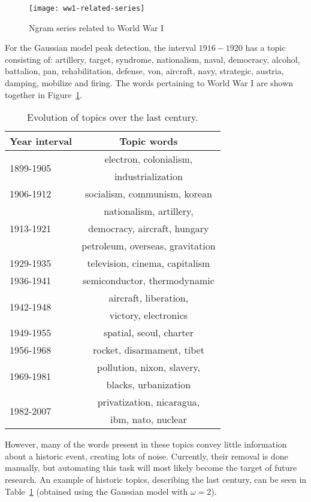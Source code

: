 \begin{figure}[t]
\centering
\texttt{[image: ww1-related-series]}
\caption{Ngram series related to World War I}
\label{fig:ww1-related-series}
\end{figure}

For the Gaussian model peak detection, the interval $1916 - 1920$ has a topic consisting of: artillery, target, syndrome, nationalism, naval, democracy, alcohol, battalion, pan, rehabilitation, defense, von, aircraft, navy, strategic, austria, damping, mobilize and firing. The words pertaining to World War I are shown together in Figure~\ref{fig:ww1-related-series}.

\begin{table}[h]
\begin{center}
\begin{tabular}{|l|c|}
\hline \bf Year interval & \bf Topic words \\ \hline
\multirow{2}{*}{1899-1905} & electron, colonialism, \\
	& industrialization \\ \hline
1906-1912 & socialism, communism, korean \\ \hline
\multirow{3}{*}{1913-1921} & nationalism, artillery, \\
	& democracy, aircraft, hungary \\ \hline
1922-1928 & petroleum, overseas, gravitation \\ \hline
1929-1935 & television, cinema, capitalism \\ \hline
1936-1941 & semiconductor, thermodynamic \\ \hline
\multirow{2}{*}{1942-1948} & aircraft, liberation, \\
	& victory, electronics \\ \hline
1949-1955 & spatial, seoul, charter \\ \hline
1956-1968 & rocket, disarmament, tibet \\ \hline
\multirow{2}{*}{1969-1981} & pollution, nixon, slavery, \\
	& blacks, urbanization \\ \hline
\multirow{2}{*}{1982-2007} & privatization, nicaragua, \\
	& ibm, nato, nuclear \\
\hline
\end{tabular}
\end{center}
\caption{\label{tbl:topic-evolution} Evolution of topics over the last century. }
\end{table}

However, many of the words present in these topics convey little information about a historic event, creating lots of noise. Currently, their removal is done manually, but automating this task will most likely become the target of future research. An example of historic topics, describing the last century, can be seen in Table~\ref{tbl:topic-evolution} (obtained using the Gaussian model with $\omega = 2$).
